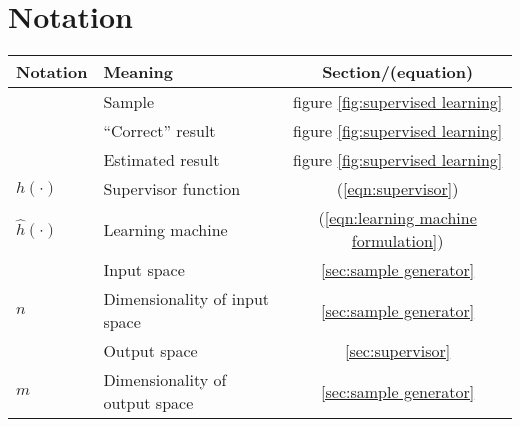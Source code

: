 \chapter{Notation}

\begin{tabular}{l l c}

\bf{Notation}		& \bf{Meaning}		& \bf{Section/(equation)} \\
\hline \hline
\bfx		& Sample	& figure \ref{fig:supervised learning} \\
\bfy		& ``Correct'' result & figure \ref{fig:supervised learning} \\
\bfyh		& Estimated result & figure \ref{fig:supervised learning} \\
$h(\cdot)$	& Supervisor function & (\ref{eqn:supervisor}) \\
$\hat{h}(\cdot)$& Learning machine & (\ref{eqn:learning machine formulation})\\
\calI		& Input space & \ref{sec:sample generator} \\
$n$		& Dimensionality of input space & \ref{sec:sample generator} \\
\calO		& Output space & \ref{sec:supervisor} \\
$m$		& Dimensionality of output space & \ref{sec:sample generator}\\
\hline
\end{tabular}
